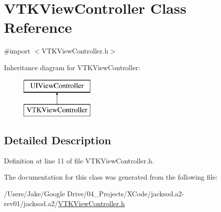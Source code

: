 \hypertarget{interface_v_t_k_view_controller}{\section{V\+T\+K\+View\+Controller Class Reference}
\label{interface_v_t_k_view_controller}
}


{\ttfamily \#import $<$V\+T\+K\+View\+Controller.\+h$>$}

Inheritance diagram for V\+T\+K\+View\+Controller\+:\begin{figure}[H]
\begin{center}
\leavevmode
\includegraphics[height=2.000000cm]{interface_v_t_k_view_controller}
\end{center}
\end{figure}


\subsection{Detailed Description}


Definition at line 11 of file V\+T\+K\+View\+Controller.\+h.



The documentation for this class was generated from the following file\+:\begin{DoxyCompactItemize}
\item 
/\+Users/\+Jake/\+Google Drive/04\+\_\+\+Projects/\+X\+Code/jacksod.\+a2-\/rev01/jacksod.\+a2/\hyperlink{_v_t_k_view_controller_8h}{V\+T\+K\+View\+Controller.\+h}\end{DoxyCompactItemize}
